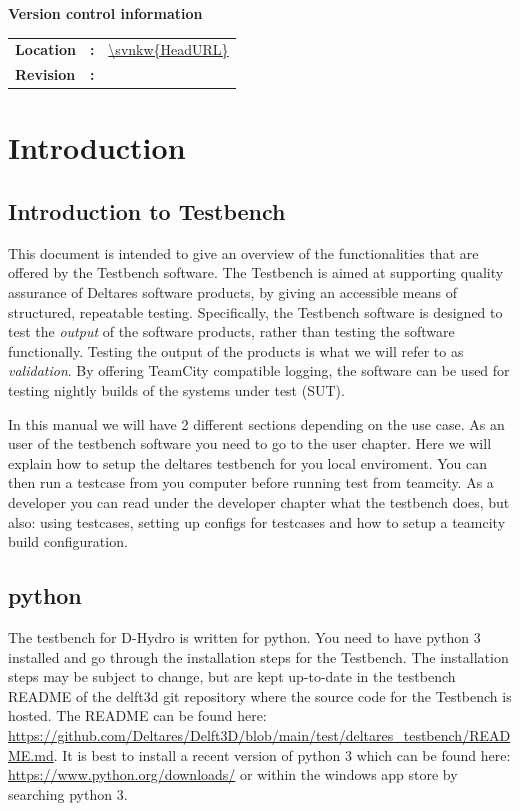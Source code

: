 \documentclass{deltares_memo}
\begin{document}
\memoConfidentialUntil{}
\memoDate {\today}
\memoTelephone{}
\memoCopy{---}

\deltarestitle

{{\footnotesize
		{\textbf{Version control information}}
		
		\begin{tabular}{@{}p{}@{}p{0mm}p{\textwidth-27mm-24pt}}
			\textbf{Location} & \textbf{:} & \url{\svnkw{HeadURL}} \\
			\textbf{Revision} & \textbf{:} & \svnrev 
		\end{tabular}
}}

\tableofcontents

\newpage
\section{Introduction}
\subsection{Introduction to Testbench}

This document is intended to give an overview of the functionalities that are offered by the Testbench software. The Testbench is aimed at supporting quality assurance of Deltares software products, by giving an accessible means of structured, repeatable testing. Specifically, the Testbench software is designed to test the {\em output} of the software products, rather than testing the software functionally. Testing the output of the products is what we will refer to as {\em validation}. By offering TeamCity compatible logging, the software can be used for testing nightly builds of the systems under test (SUT). 

In this manual we will have 2 different sections depending on the use case. As an user of the testbench software you need to go to the user chapter. Here we will explain how to setup the deltares testbench for you local enviroment. You can then run a testcase from you computer before running test from teamcity. As a developer you can read under the developer chapter what the testbench does, but also: using testcases, setting up configs for testcases and how to setup a teamcity build configuration. 

\subsection{python}
\label{ssec:python}
The testbench for D-Hydro is written for python. You need to have python 3 installed and go through the installation steps for the Testbench. The installation steps
may be subject to change, but are kept up-to-date in the testbench README of the delft3d git repository where the source code for the Testbench is hosted.
The README can be found here: \url{https://github.com/Deltares/Delft3D/blob/main/test/deltares_testbench/README.md}.
It is best to install a recent version of python 3 which can be found here: \url{https://www.python.org/downloads/} or within the windows app store by searching python 3.
\end{document}
